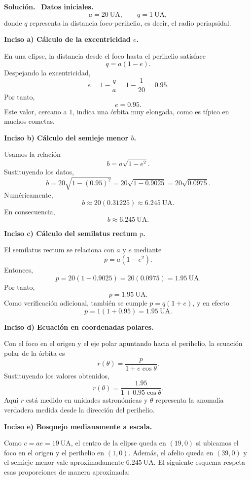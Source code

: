 \documentclass[11pt]{article}
\theoremstyle{prismstyle}
\newenvironment{solution}[1][Solución]
  {\par\textbf{#1.}\ }
  {\par}
\begin{document}
\begin{solution}
\textbf{Datos iniciales.}
\[
a = 20\ \text{UA},
\qquad
q = 1\ \text{UA},
\]
donde $q$ representa la distancia foco-perihelio, es decir, el radio periapsidal.

\textbf{Inciso a) Cálculo de la excentricidad $e$.}

En una elipse, la distancia desde el foco hasta el perihelio satisface
\[
q = a(1-e).
\]
Despejando la excentricidad,
\[
e = 1 - \frac{q}{a} = 1 - \frac{1}{20} = 0.95.
\]
Por tanto,
\[
\boxed{e = 0.95}.
\]
Este valor, cercano a $1$, indica una órbita muy elongada, como es típico en muchos cometas.

\textbf{Inciso b) Cálculo del semieje menor $b$.}

Usamos la relación
\[
b = a\sqrt{1-e^2}.
\]
Sustituyendo los datos,
\[
b = 20\sqrt{1-(0.95)^2} = 20\sqrt{1-0.9025} = 20\sqrt{0.0975}.
\]
Numéricamente,
\[
b \approx 20(0.31225) \approx 6.245\ \text{UA}.
\]
En consecuencia,
\[
\boxed{b \approx 6.245\ \text{UA}}.
\]

\textbf{Inciso c) Cálculo del semilatus rectum $p$.}

El semilatus rectum se relaciona con $a$ y $e$ mediante
\[
p = a(1-e^2).
\]
Entonces,
\[
p = 20(1-0.9025) = 20(0.0975) = 1.95\ \text{UA}.
\]
Por tanto,
\[
\boxed{p = 1.95\ \text{UA}}.
\]
Como verificación adicional, también se cumple $p = q(1+e)$, y en efecto
\[
p = 1(1+0.95) = 1.95\ \text{UA}.
\]

\textbf{Inciso d) Ecuación en coordenadas polares.}

Con el foco en el origen y el eje polar apuntando hacia el perihelio, la ecuación polar de la órbita es
\[
r(\theta) = \frac{p}{1+e\cos\theta}.
\]
Sustituyendo los valores obtenidos,
\[
\boxed{r(\theta) = \frac{1.95}{1+0.95\cos\theta}}.
\]
Aquí $r$ está medido en unidades astronómicas y $\theta$ representa la anomalía verdadera medida desde la dirección del perihelio.

\textbf{Inciso e) Bosquejo medianamente a escala.}

Como $c = ae = 19\ \text{UA}$, el centro de la elipse queda en $(19,0)$ si ubicamos el foco en el origen y el perihelio en $(1,0)$. Además, el afelio queda en $(39,0)$ y el semieje menor vale aproximadamente $6.245\ \text{UA}$. El siguiente esquema respeta esas proporciones de manera aproximada:


\end{solution}
\end{document}
